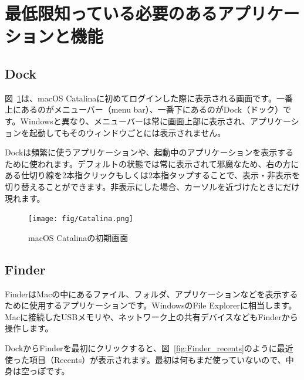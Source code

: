 \section{最低限知っている必要のあるアプリケーションと機能}

\subsection{Dock}
図~\ref{fig:Catalina}は、macOS Catalinaに初めてログインした際に表示される画面です。一番上にあるのがメニューバー（menu bar）、一番下にあるのがDock（ドック）です。Windowsと異なり、メニューバーは常に画面上部に表示され、アプリケーションを起動してもそのウィンドウごとには表示されません。

Dockは頻繁に使うアプリケーションや、起動中のアプリケーションを表示するために使われます。デフォルトの状態では常に表示されて邪魔なため、右の方にある仕切り線を2本指クリックもしくは2本指タップすることで、表示・非表示を切り替えることができます。非表示にした場合、カーソルを近づけたときにだけ現れます。
\begin{figure}
  \centering
  \texttt{[image: fig/Catalina.png]}
  \caption{macOS Catalinaの初期画面}
  \label{fig:Catalina}
\end{figure}

\subsection{Finder}
\label{subsec:Finder}
FinderはMacの中にあるファイル、フォルダ、アプリケーションなどを表示するために使用するアプリケーションです。WindowsのFile Explorerに相当します。Macに接続したUSBメモリや、ネットワーク上の共有デバイスなどもFinderから操作します。

DockからFinderを最初にクリックすると、図~\ref{fig:Finder_recents}のように最近使った項目（Recents）が表示されます。最初は何もまだ使っていないので、中身は空っぽです。

